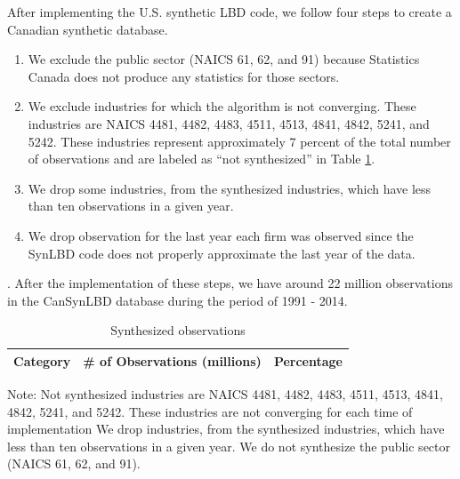\documentclass{article}
\begin{document}


After implementing the U.S. synthetic LBD code, we follow four steps to create a Canadian synthetic database. \begin{enumerate}
    \item We exclude the public sector (NAICS 61, 62, and 91) because Statistics Canada does not produce any statistics for those sectors.
    \item We exclude industries for which the algorithm is not converging. These industries are NAICS 4481,    4482,     4483,     4511,     4513,     4841,     4842,     5241, and 5242. These industries represent approximately 7 percent of the total number of observations and are labeled as ``not synthesized'' in Table \ref{Synthesized_observations}.
    \item We drop some industries, from the synthesized industries, which have less than ten observations in a given year.
    \item We drop observation for the last year each firm was observed since the SynLBD code does not properly approximate the last year of the data.
\end{enumerate}. 
After the implementation of these steps, we have around 22 million observations in the CanSynLBD database during the period of 1991 - 2014.

\begin{table}[H]
  \centering
\begin{threeparttable}
  \caption{Synthesized observations}  \label{Synthesized_observations} \medskip
  \renewcommand{\arraystretch}{1}
  \begin{tabular}{l  c c }
    \toprule
    \textbf{Category}&\textbf{\# of Observations (millions)}&\textbf{Percentage}\\
    \midrule

   \bottomrule
  \end{tabular} 
\begin{tablenotes}
\small
\item Note: Not synthesized industries are NAICS 4481,    4482,     4483,     4511,     4513,     4841,     4842, 5241, and 5242. These industries are not converging for each time of implementation We drop industries, from the synthesized industries, which have less than ten observations in a given year. We do not synthesize the public sector (NAICS 61, 62, and 91).
 \end{tablenotes}
 \end{threeparttable}
\end{table}
\end{document}

